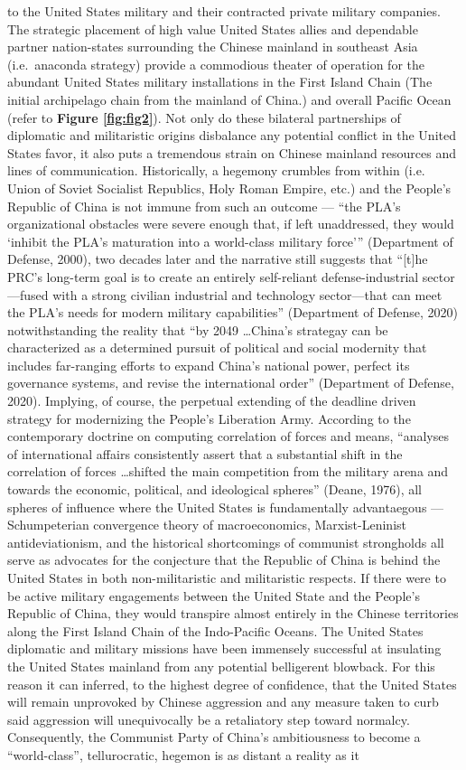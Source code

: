 \documentclass[12pt]{article}
\begin{document}
to the United States military and their contracted private military companies. The strategic placement of high value United States allies and dependable partner nation-states surrounding the Chinese mainland in southeast Asia (i.e.\ anaconda strategy) provide a commodious theater of operation for the abundant United States military installations in the First Island Chain (The initial archipelago chain from the mainland of China.) and overall Pacific Ocean (refer to \textbf{Figure \ref{fig:fig2}}). Not only do these bilateral partnerships of diplomatic and militaristic origins disbalance any potential conflict in the United States favor, it also puts a tremendous strain on Chinese mainland resources and lines of communication. Historically, a hegemony crumbles from within (i.e. Union of Soviet Socialist Republics, Holy Roman Empire, etc.) and the People's Republic of China is not immune from such an outcome — “the PLA's organizational obstacles were severe enough that, if left unaddressed, they would `inhibit the PLA's maturation into a world-class military force'” (Department of Defense, 2000), two decades later and the narrative still suggests that “[t]he PRC's long-term goal is to create an entirely self-reliant defense-industrial sector—fused with a  strong  civilian  industrial  and  technology  sector—that can meet the PLA's needs for modern military capabilities” (Department of Defense, 2020) notwithstanding the reality that “by 2049 \dots China's strategay can be characterized as a determined pursuit of political and social modernity that includes far-ranging efforts to expand China's national power, perfect its governance systems, and revise the international order” (Department of Defense, 2020). Implying, of course, the perpetual extending of the deadline driven strategy for modernizing the People's Liberation Army. According to the contemporary doctrine on computing correlation of forces and means, “analyses of international affairs consistently assert that a substantial shift in the correlation of forces \dots shifted the main competition from the military arena and towards the economic, political, and ideological spheres” (Deane, 1976), all spheres of influence where the United States is fundamentally advantaegous — Schumpeterian convergence theory of macroeconomics, Marxist-Leninist antideviationism, and the historical shortcomings of communist strongholds all serve as advocates for the conjecture that the Republic of China is behind the United States in both non-militaristic and militaristic respects. If there were to be active military engagements between the United State and the People's Republic of China, they would transpire almost entirely in the Chinese territories along the First Island Chain of the Indo-Pacific Oceans. The United States diplomatic and military missions have been immensely successful at insulating the United States mainland from any potential belligerent blowback. For this reason it can inferred, to the highest degree of confidence, that the United States will remain unprovoked by Chinese aggression and any measure taken to curb said aggression will unequivocally be a retaliatory step toward normalcy. Consequently, the Communist Party of China's ambitiousness to become a “world-class”, tellurocratic, hegemon is as distant a reality as it 
\end{document}
